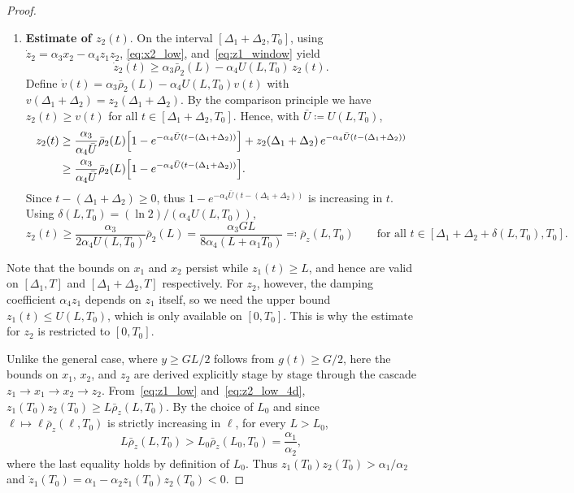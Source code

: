 \documentclass[10pt,a4paper]{amsart}
\begin{document}
\begin{proof}
\begin{enumerate}[leftmargin=*]
    \item \textbf{Estimate of $z_2(t)$}. On the interval 
    $[\Delta_1+\Delta_2,T_0]$, using $\dot z_2=\alpha_3 x_2-\alpha_4 
    z_1 z_2$, \eqref{eq:x2_low}, and~\eqref{eq:z1_window} yield
    \begin{equation*}
        \dot z_2(t) \ge \alpha_3\bar\rho_2(L) - \alpha_4 U(L,T_0)\,z_2(t).
    \end{equation*}
    Define $\dot v(t)=\alpha_3\bar\rho_2(L)-\alpha_4 U(L,T_0)v(t)$ with 
    $v(\Delta_1+\Delta_2)=z_2(\Delta_1+\Delta_2)$.
    By the comparison principle we have $z_2(t)\ge v(t)$ for all
    $t\in[\Delta_1+\Delta_2,T_0]$. Hence, with $\bar U\coloneqq U(L,T_0)$,
    \begin{equation*}
        \begin{aligned}
            z_2(t) &\ge \frac{\alpha_3}{\alpha_4\bar U}\bar\rho_2(L) 
            \Bigl[1-e^{-\alpha_4\bar U(t-(\Delta_1+\Delta_2))}\Bigr]
            + z_2(\Delta_1+\Delta_2)\,e^{-\alpha_4\bar U(t-(\Delta_1+\Delta_2))} \\
            &\ge \frac{\alpha_3}{\alpha_4\bar U}\bar\rho_2(L) 
            \Bigl[1-e^{-\alpha_4\bar U(t-(\Delta_1+\Delta_2))}\Bigr].
        \end{aligned}
    \end{equation*}
    Since $t-(\Delta_1+\Delta_2)\ge 0$, thus $1-e^{-\alpha_4\bar U(t-(\Delta_1+\Delta_2))}$ is increasing in $t$. Using $\delta(L,T_0)=(\ln 2)/(\alpha_4 U(L,T_0))$,
    \begin{equation}\label{eq:z2_low_4d}
        z_2(t) \ge \frac{\alpha_3}{2\alpha_4 U(L,T_0)}\bar\rho_2(L) 
        = \frac{\alpha_3 GL}{8\alpha_4(L+\alpha_1 T_0)} 
        \eqqcolon \bar\rho_z(L,T_0)
        \qquad\text{for all } t\in[\Delta_1+\Delta_2+\delta(L,T_0),T_0].
    \end{equation}
\end{enumerate}

Note that the bounds on $x_1$ and $x_2$ persist while $z_1(t)\ge L$, and 
hence are valid on $[\Delta_1,T]$ and $[\Delta_1+\Delta_2,T]$ respectively. 
For $z_2$, however, the damping coefficient $\alpha_4 z_1$ depends on $z_1$ 
itself, so we need the upper bound $z_1(t)\le U(L,T_0)$, which is only 
available on $[0,T_0]$. This is why the estimate for $z_2$ is restricted 
to $[0,T_0]$.

Unlike the general case, where $y\ge GL/2$ follows from $g(t)\ge G/2$, 
here the bounds on $x_1$, $x_2$, and $z_2$ are derived explicitly stage 
by stage through the cascade $z_1\to x_1\to x_2\to z_2$. 
From~\eqref{eq:z1_low} and~\eqref{eq:z2_low_4d}, 
$z_1(T_0)z_2(T_0)\ge L\bar\rho_z(L,T_0)$.
By the choice of $L_0$ and since $\ell\mapsto\ell\bar\rho_z(\ell,T_0)$ 
is strictly increasing in $\ell$, for every 
$L>L_0$,
\begin{equation*}
    L\bar\rho_z(L,T_0) > L_0\bar\rho_z(L_0,T_0) = \frac{\alpha_1}{\alpha_2},
\end{equation*}
where the last equality holds by definition of $L_0$. Thus
$z_1(T_0)z_2(T_0)>\alpha_1/\alpha_2$ and 
$\dot z_1(T_0)=\alpha_1-\alpha_2 z_1(T_0)z_2(T_0)<0$.


\end{proof}
\end{document}
